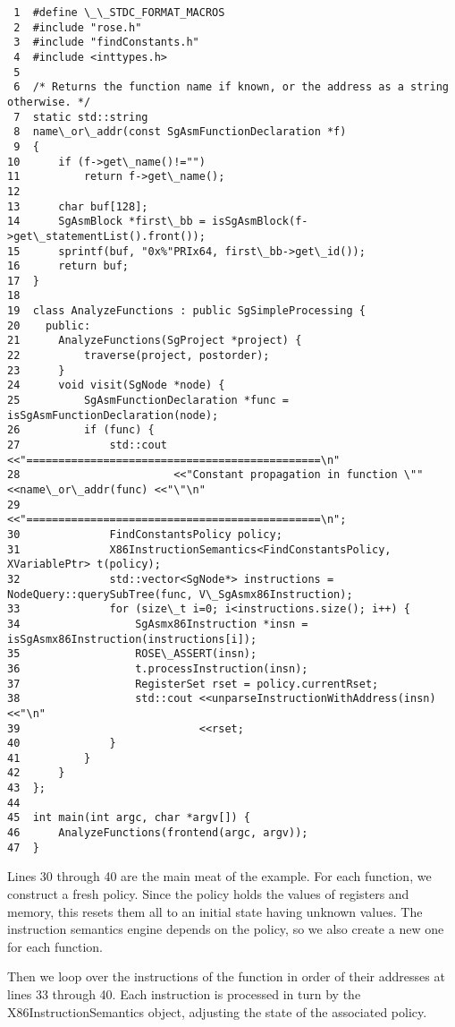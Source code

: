 \begin{verbatim}
 1  #define \_\_STDC_FORMAT_MACROS
 2  #include "rose.h"
 3  #include "findConstants.h"
 4  #include <inttypes.h>
 5
 6  /* Returns the function name if known, or the address as a string otherwise. */
 7  static std::string
 8  name\_or\_addr(const SgAsmFunctionDeclaration *f)
 9  {
10      if (f->get\_name()!="")
11          return f->get\_name();
12  
13      char buf[128];
14      SgAsmBlock *first\_bb = isSgAsmBlock(f->get\_statementList().front());
15      sprintf(buf, "0x%"PRIx64, first\_bb->get\_id());
16      return buf;
17  }
18
19  class AnalyzeFunctions : public SgSimpleProcessing {
20    public:
21      AnalyzeFunctions(SgProject *project) {
22          traverse(project, postorder);
23      }
24      void visit(SgNode *node) {
25          SgAsmFunctionDeclaration *func = isSgAsmFunctionDeclaration(node);
26          if (func) {
27              std::cout <<"==============================================\n"
28                        <<"Constant propagation in function \"" <<name\_or\_addr(func) <<"\"\n"
29                        <<"==============================================\n";
30              FindConstantsPolicy policy;
31              X86InstructionSemantics<FindConstantsPolicy, XVariablePtr> t(policy);
32              std::vector<SgNode*> instructions = NodeQuery::querySubTree(func, V\_SgAsmx86Instruction);
33              for (size\_t i=0; i<instructions.size(); i++) {
34                  SgAsmx86Instruction *insn = isSgAsmx86Instruction(instructions[i]);
35                  ROSE\_ASSERT(insn);
36                  t.processInstruction(insn);
37                  RegisterSet rset = policy.currentRset;
38                  std::cout <<unparseInstructionWithAddress(insn) <<"\n"
39                            <<rset;
40              }
41          }
42      }
43  };
44
45  int main(int argc, char *argv[]) {
46      AnalyzeFunctions(frontend(argc, argv));
47  }
\end{verbatim}

Lines 30 through 40 are the main meat of the example. For each
function, we construct a fresh policy. Since the policy holds the
values of registers and memory, this resets them all to an initial
state having unknown values.  The instruction semantics engine depends
on the policy, so we also create a new one for each function.

Then we loop over the instructions of the function in order of their
addresses at lines 33 through 40.  Each instruction is processed in
turn by the X86InstructionSemantics object, adjusting the state of the
associated policy.

